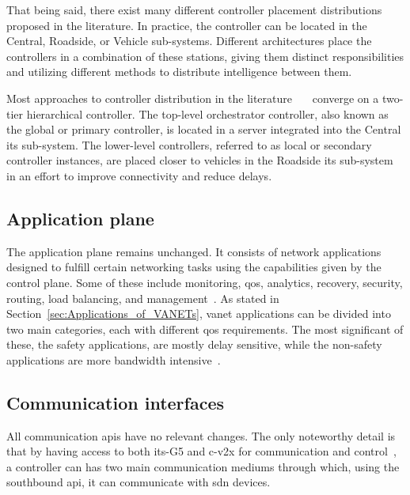 That being said, there exist many different controller placement distributions proposed in the literature. In practice, the controller can be located in the Central, Roadside, or Vehicle sub-systems. Different architectures place the controllers in a combination of these stations, giving them distinct responsibilities and utilizing different methods to distribute intelligence between them.

Most approaches to controller distribution in the literature~\cite{bhatia_software_2019}~\cite{cardona_software-defined_2020}~\cite{toufga_openflow_2018} converge on a two-tier hierarchical controller. The top-level orchestrator controller, also known as the global or primary controller, is located in a server integrated into the Central \gls{its} sub-system. The lower-level controllers, referred to as local or secondary controller instances, are placed closer to vehicles in the Roadside \gls{its} sub-system in an effort to improve connectivity and reduce delays. 

\subsection{Application plane}

The application plane remains unchanged. It consists of network applications designed to fulfill certain networking tasks using the capabilities given by the control plane. Some of these include monitoring, \gls{qos}, analytics, recovery, security, routing, load balancing, and management~\cite{bhatia_software_2019}. As stated in Section~\ref{sec:Applications_of_VANETs}, \gls{vanet} applications can be divided into two main categories, each with different \gls{qos} requirements. The most significant of these, the safety applications, are mostly delay sensitive, while the non-safety applications are more bandwidth intensive~\cite{smida_efficient_2020}. 


\subsection{Communication interfaces}

All communication \glspl{api} have no relevant changes. The only noteworthy detail is that  by having access to both \gls{its}-G5 and \gls{c-v2x} for communication and control~\cite{toufga_openflow_2018}, a controller can has two main communication mediums through which, using the southbound \gls{api}, it can communicate with \gls{sdn} devices. 

